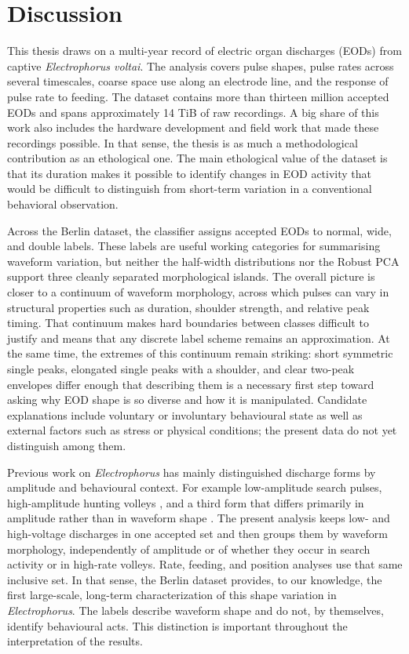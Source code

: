 \clearpage
\section{Discussion}

This thesis draws on a multi-year record of electric organ discharges (EODs) from captive \textit{Electrophorus voltai}.
The analysis covers pulse shapes, pulse rates across several timescales, coarse space use along an electrode line, and the response of pulse rate to feeding. 
The dataset contains more than thirteen million accepted EODs and spans approximately 14 TiB of raw recordings. 
A big share of this work also includes the hardware development and field work that made these recordings possible. 
In that sense, the thesis is as much a methodological contribution as an ethological one.
The main ethological value of the dataset is that its duration makes it possible to identify changes in EOD activity that would be difficult to distinguish from short-term variation in a conventional behavioral observation.

Across the Berlin dataset, the classifier assigns accepted EODs to normal, wide, and double labels. 
These labels are useful working categories for summarising waveform variation, but neither the half-width distributions nor the Robust PCA support three cleanly separated morphological islands. 
The overall picture is closer to a continuum of waveform morphology, across which pulses can vary in structural properties such as duration, shoulder strength, and relative peak timing. 
That continuum makes hard boundaries between classes difficult to justify and means that any discrete label scheme remains an approximation. 
At the same time, the extremes of this continuum remain striking: short symmetric single peaks, elongated single peaks with a shoulder, and clear two-peak envelopes differ enough that describing them is a necessary first step toward asking why EOD shape is so diverse and how it is manipulated. 
Candidate explanations include voluntary or involuntary behavioural state as well as external factors such as stress or physical conditions; the present data do not yet distinguish among them.

Previous work on \textit{Electrophorus} has mainly distinguished discharge forms by amplitude and behavioural context. 
For example low-amplitude search pulses, high-amplitude hunting volleys \parencite{catania2019astonishing}, and a third form that differs primarily in amplitude rather than in waveform shape \parencite{xu2021third}.
The present analysis keeps low- and high-voltage discharges in one accepted set and then groups them by waveform morphology, independently of amplitude or of whether they occur in search activity or in high-rate volleys.
Rate, feeding, and position analyses use that same inclusive set.
In that sense, the Berlin dataset provides, to our knowledge, the first large-scale, long-term characterization of this shape variation in \textit{Electrophorus}.
The labels describe waveform shape and do not, by themselves, identify behavioural acts. 
This distinction is important throughout the interpretation of the results.

